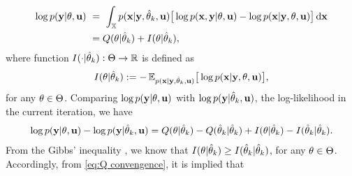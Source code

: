\begin{equation} \label{eq:log likelihoood}
    \begin{split}
        \log p(\mathbf{y}|{ \mathrm{\theta} },\mathbf{u}) \, \, 
        &=\,\, 
        \int_{{\mathbb{X}}} p(\mathbf{x}|\mathbf{y},\hat{{ \mathrm{\theta} }}_k,\mathbf{u})
        \big[
        \log p(\mathbf{x},\mathbf{y}|{ \mathrm{\theta} },\mathbf{u}) - \log p(\mathbf{x}|\mathbf{y},{ \mathrm{\theta} },\mathbf{u})
        \big]\,\mathrm{d} \mathbf{x}\\
        &= Q({ \mathrm{\theta} }|\hat{{ \mathrm{\theta} }}_k) + I({ \mathrm{\theta} }|\hat{{ \mathrm{\theta} }}_k),
    \end{split} 
\end{equation}
where function $I(\cdot|\hat{{ \mathrm{\theta} }}_k):\Theta\to{\mathbb{R}}$ is defined as 
\begin{equation}
    I({ \mathrm{\theta} }|\hat{{ \mathrm{\theta} }}_k) 
    := 
    -\, \mathbb{E}_{p(\mathbf{x} | \mathbf{y},\hat{{ \mathrm{\theta} }}_k,\mathbf{u})} 
    \big[
    \log p(\mathbf{x}|\mathbf{y},{ \mathrm{\theta} },\mathbf{u})
    \big], 
\end{equation}
for any ${ \mathrm{\theta} }\in\Theta$.
Comparing $\log p(\mathbf{y}|{ \mathrm{\theta} },\mathbf{u})$ with $\log p(\mathbf{y}|\hat{{ \mathrm{\theta} }}_k,\mathbf{u})$, the log-likelihood in the current iteration, we have
\begin{equation} \label{eq:Q convengence}
    \begin{split}
        \log p(\mathbf{y}|{ \mathrm{\theta} },\mathbf{u}) 
        - 
        \log p(\mathbf{y}|\hat{{ \mathrm{\theta} }}_k,\mathbf{u}) =  Q({ \mathrm{\theta} }|\hat{{ \mathrm{\theta} }}_k) - Q(\hat{{ \mathrm{\theta} }}_k|\hat{{ \mathrm{\theta} }}_k) + I({ \mathrm{\theta} }|\hat{{ \mathrm{\theta} }}_k) - I(\hat{{ \mathrm{\theta} }}_k|\hat{{ \mathrm{\theta} }}_k).
    \end{split}
\end{equation}
From the Gibbs' inequality \cite{bremaud2012introduction}, we know that  $I({ \mathrm{\theta} }|\hat{{ \mathrm{\theta} }}_k) \ge I(\hat{{ \mathrm{\theta} }}_k|\hat{{ \mathrm{\theta} }}_k)$, for any ${ \mathrm{\theta} }\in\Theta$. Accordingly, from \eqref{eq:Q convengence}, it is implied that
